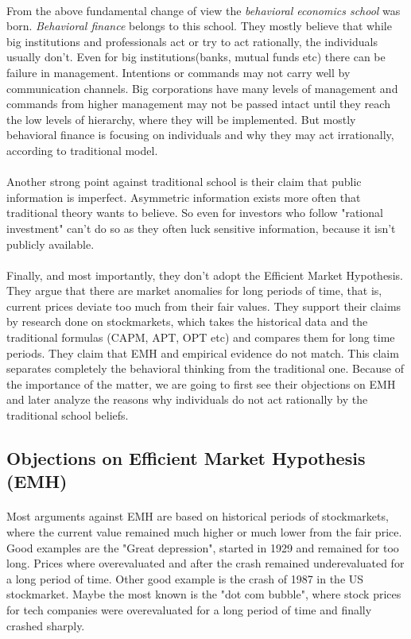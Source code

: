 \documentclass{article}
\begin{document}
\paragraph{ }
From the above fundamental change of view the \emph{behavioral economics school} was born. \emph{Behavioral finance} belongs to this school. They mostly believe that while big institutions and professionals act or try to act rationally, the individuals usually don't. Even for big institutions(banks, mutual funds etc) there can be failure in management. Intentions or commands may not carry well by communication channels. Big corporations have many levels of management and commands from higher management may not be passed intact until they reach the low levels of hierarchy, where they will be implemented. But mostly behavioral finance is focusing on individuals and why they may act irrationally, according to traditional model.
\paragraph{ }
Another strong point against traditional school is their claim that public information is imperfect. Asymmetric information exists more often that traditional theory wants to believe. So even for investors who follow "rational investment" can't do so as they often luck sensitive information, because it isn't publicly available.
\paragraph{ }
Finally, and most importantly, they don't adopt the Efficient Market Hypothesis. They argue that there are market anomalies for long periods of time, that is, current prices deviate too much from their fair values. They support their claims by research done on stockmarkets, which takes the historical data and the traditional formulas (CAPM, APT, OPT etc) and compares them for long time periods. They claim that EMH and empirical evidence do not match. This claim separates completely the behavioral thinking from the traditional one. Because of the importance of the matter, we are going to first see their objections on EMH and later analyze the reasons why individuals do not act rationally by the traditional school beliefs.

\subsection{Objections on Efficient Market Hypothesis (EMH)}
\paragraph{ }
Most arguments against EMH are based on historical periods of stockmarkets, where the current value remained much higher or much lower from the fair price. Good examples are the "Great depression", started in 1929 and remained for too long. Prices where overevaluated and after the crash remained underevaluated for a long period of time. Other good example is the crash of 1987 in the US stockmarket. Maybe the most known is the "dot com bubble", where stock prices for tech companies were overevaluated for a long period of time and finally crashed sharply. 
\end{document}
